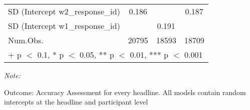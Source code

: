 \begin{table}
\begin{threeparttable}
\begin{tabular}[t]{lccc}
SD (Intercept w2\_response\_id) & 0.186 &  & 0.187\\
SD (Intercept w1\_response\_id) &  & 0.191 & \\
\midrule
Num.Obs. & 20795 & 18593 & 18709\\
\bottomrule
\multicolumn{4}{l}{\rule{0pt}{1em}+ p $<$ 0.1, * p $<$ 0.05, ** p $<$ 0.01, *** p $<$ 0.001}\\
\end{tabular}
\begin{tablenotes}
\item \textit{Note: } 
\item Outcome: Accuracy Assessment for every headline. All models contain random intercepts at the headline and participant level
\end{tablenotes}
\end{threeparttable}
\end{table}
